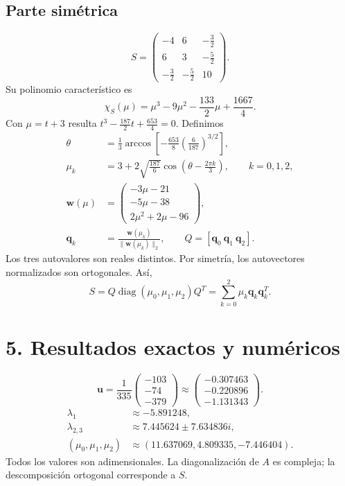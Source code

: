 \documentclass[spanish,letterpaper,oneside]{article}
\begin{document}
\subsection*{Parte simétrica}
\begin{equation}
S=\begin{pmatrix}-4&6&-\frac32\\6&3&-\frac52\\-\frac32&-\frac52&10\end{pmatrix}.
\end{equation}
Su polinomio característico es
\begin{equation}
\chi_S(\mu)=\mu^3-9\mu^2-\frac{133}{2}\mu+\frac{1667}{4}.
\end{equation}
Con $\mu=t+3$ resulta $t^3-\frac{187}{2}t+\frac{653}{4}=0$. Definimos
\begin{align}
\theta&=\frac13\arccos\left[-\frac{653}{8}\left(\frac6{187}\right)^{3/2}\right],\\
\mu_k&=3+2\sqrt{\frac{187}{6}}\cos\left(\theta-\frac{2\pi k}{3}\right),\qquad k=0,1,2,\\
\mathbf{w}(\mu)&=\begin{pmatrix}-3\mu-21\\-5\mu-38\\2\mu^2+2\mu-96\end{pmatrix},\\
\mathbf{q}_k&=\frac{\mathbf{w}(\mu_k)}{\|\mathbf{w}(\mu_k)\|_2},\qquad
Q=[\mathbf{q}_0\ \mathbf{q}_1\ \mathbf{q}_2].
\end{align}
Los tres autovalores son reales distintos. Por simetría, los autovectores normalizados son ortogonales. Así,
\begin{equation}
S=Q\operatorname{diag}(\mu_0,\mu_1,\mu_2)Q^T
=\sum_{k=0}^2\mu_k\mathbf{q}_k\mathbf{q}_k^T.
\end{equation}

\section*{5. Resultados exactos y numéricos}
\begin{equation}
\mathbf{u}=\frac1{335}\begin{pmatrix}-103\\-74\\-379\end{pmatrix}
\approx\begin{pmatrix}-0.307463\\-0.220896\\-1.131343\end{pmatrix}.
\end{equation}
\begin{align}
\lambda_1&\approx-5.891248,\\
\lambda_{2,3}&\approx7.445624\pm7.634836i,\\
(\mu_0,\mu_1,\mu_2)&\approx(11.637069,4.809335,-7.446404).
\end{align}
Todos los valores son adimensionales. La diagonalización de $A$ es compleja; la descomposición ortogonal corresponde a $S$.
\end{document}
